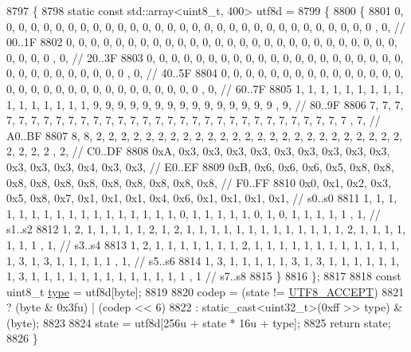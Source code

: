 \begin{DoxyCode}
8797     \{
8798         \textcolor{keyword}{static} \textcolor{keyword}{const} std::array<uint8\_t, 400> utf8d =
8799         \{
8800             \{
8801                 0, 0, 0, 0, 0, 0, 0, 0, 0, 0, 0, 0, 0, 0, 0, 0, 0, 0, 0, 0, 0, 0, 0, 0, 0, 0, 0, 0, 0, 0, 0
      , 0, \textcolor{comment}{// 00..1F}
8802                 0, 0, 0, 0, 0, 0, 0, 0, 0, 0, 0, 0, 0, 0, 0, 0, 0, 0, 0, 0, 0, 0, 0, 0, 0, 0, 0, 0, 0, 0, 0
      , 0, \textcolor{comment}{// 20..3F}
8803                 0, 0, 0, 0, 0, 0, 0, 0, 0, 0, 0, 0, 0, 0, 0, 0, 0, 0, 0, 0, 0, 0, 0, 0, 0, 0, 0, 0, 0, 0, 0
      , 0, \textcolor{comment}{// 40..5F}
8804                 0, 0, 0, 0, 0, 0, 0, 0, 0, 0, 0, 0, 0, 0, 0, 0, 0, 0, 0, 0, 0, 0, 0, 0, 0, 0, 0, 0, 0, 0, 0
      , 0, \textcolor{comment}{// 60..7F}
8805                 1, 1, 1, 1, 1, 1, 1, 1, 1, 1, 1, 1, 1, 1, 1, 1, 9, 9, 9, 9, 9, 9, 9, 9, 9, 9, 9, 9, 9, 9, 9
      , 9, \textcolor{comment}{// 80..9F}
8806                 7, 7, 7, 7, 7, 7, 7, 7, 7, 7, 7, 7, 7, 7, 7, 7, 7, 7, 7, 7, 7, 7, 7, 7, 7, 7, 7, 7, 7, 7, 7
      , 7, \textcolor{comment}{// A0..BF}
8807                 8, 8, 2, 2, 2, 2, 2, 2, 2, 2, 2, 2, 2, 2, 2, 2, 2, 2, 2, 2, 2, 2, 2, 2, 2, 2, 2, 2, 2, 2, 2
      , 2, \textcolor{comment}{// C0..DF}
8808                 0xA, 0x3, 0x3, 0x3, 0x3, 0x3, 0x3, 0x3, 0x3, 0x3, 0x3, 0x3, 0x3, 0x4, 0x3, 0x3, \textcolor{comment}{// E0..EF}
8809                 0xB, 0x6, 0x6, 0x6, 0x5, 0x8, 0x8, 0x8, 0x8, 0x8, 0x8, 0x8, 0x8, 0x8, 0x8, 0x8, \textcolor{comment}{// F0..FF}
8810                 0x0, 0x1, 0x2, 0x3, 0x5, 0x8, 0x7, 0x1, 0x1, 0x1, 0x4, 0x6, 0x1, 0x1, 0x1, 0x1, \textcolor{comment}{// s0..s0}
8811                 1, 1, 1, 1, 1, 1, 1, 1, 1, 1, 1, 1, 1, 1, 1, 1, 1, 0, 1, 1, 1, 1, 1, 0, 1, 0, 1, 1, 1, 1, 1
      , 1, \textcolor{comment}{// s1..s2}
8812                 1, 2, 1, 1, 1, 1, 1, 2, 1, 2, 1, 1, 1, 1, 1, 1, 1, 1, 1, 1, 1, 1, 1, 2, 1, 1, 1, 1, 1, 1, 1
      , 1, \textcolor{comment}{// s3..s4}
8813                 1, 2, 1, 1, 1, 1, 1, 1, 1, 2, 1, 1, 1, 1, 1, 1, 1, 1, 1, 1, 1, 1, 1, 3, 1, 3, 1, 1, 1, 1, 1
      , 1, \textcolor{comment}{// s5..s6}
8814                 1, 3, 1, 1, 1, 1, 1, 3, 1, 3, 1, 1, 1, 1, 1, 1, 1, 3, 1, 1, 1, 1, 1, 1, 1, 1, 1, 1, 1, 1, 1
      , 1 \textcolor{comment}{// s7..s8}
8815             \}
8816         \};
8817 
8818         \textcolor{keyword}{const} uint8\_t \hyperlink{classstd_1_1conditional_1_1type}{type} = utf8d[byte];
8819 
8820         codep = (state != \hyperlink{classnlohmann_1_1detail_1_1serializer_a52898111c3bbd130b2481dbef93c7292}{UTF8\_ACCEPT})
8821                 ? (byte & 0x3fu) | (codep << 6)
8822                 : static\_cast<uint32\_t>(0xff >> type) & (byte);
8823 
8824         state = utf8d[256u + state * 16u + type];
8825         \textcolor{keywordflow}{return} state;
8826     \}
\end{DoxyCode}
\mbox{\label{classnlohmann_1_1detail_1_1serializer_a95460ebd1a535a543e5a0ec52e00f48b}} 
